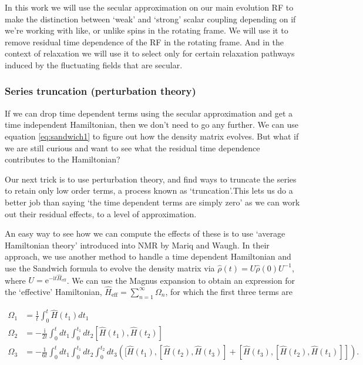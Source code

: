 \documentclass[notitlepage,11pt]{article}
\newcommand{\rmi}{\mathrm{i}}
\newcommand{\rme}{\mathrm{e}}
\begin{document}
In this work we will use the secular approximation on our main evolution RF to make the distinction between `weak' and `strong' scalar coupling depending on if we're working with like, or unlike spins in the rotating frame. We will use it to remove residual time dependence of the RF in the rotating frame. And in the context of relaxation we will use it to select only for certain relaxation pathways induced by the fluctuating fields that are secular. 

\subsubsection{Series truncation (perturbation theory)}

If we can drop time dependent terms using the secular approximation and get a time independent Hamiltonian, then we don't need to go any further. We can use equation \ref{eq:sandwich1} to figure out how the density matrix evolves. But what if we are still curious and want to see what the residual time dependence contributes to the Hamiltonian?

Our next trick is to use perturbation theory, and find ways to truncate the series to retain only low order terms,  a process known as `truncation'.This lets us do a better job than saying `the time dependent terms are simply zero' as we can work out their residual effects, to a level of approximation.

An easy way to see how we can compute the effects of these is to use `average Hamiltonian theory' introduced into NMR by Mariq and Waugh. In their approach, we use another method to handle a time dependent Hamiltonian and use the Sandwich formula to evolve the density matrix via $\hat{\rho}(t)= U \hat{\rho}(0) U^{-1}$, where $U=\rme^{-\rmi t\hat{H}_{\mathrm{eff}}}$. We can use the Magnus expansion to obtain an expression for the `effective' Hamiltonian, $\hat{H}_{\mathrm{eff}}=\sum_{n=1}^\infty \Omega_n$, for which the first three terms are

\begin{equation}
  \begin{array}{rl}
    \Omega_1&= \frac{1}{t}\int_0^t \hat{H}(t_1) d t_1 \\
    \Omega_2&= -\frac{\rmi }{2 t}\int_0^t d t_1\int_0^{t_1} d t_2 [\hat{H}(t_1),\hat{H}(t_2)]  \\
    \Omega_3&= - \frac{1}{6 t}\int_0^t d t_1\int_0^{t_1} d t_2 \int_0^{t_2} d t_3 \left( [\hat{H}(t_1),[\hat{H}(t_2),\hat{H}(t_3)] + [\hat{H}(t_3),[\hat{H}(t_2),\hat{H}(t_1)]]\right).
\end{array}
  \end{equation}
\end{document}
